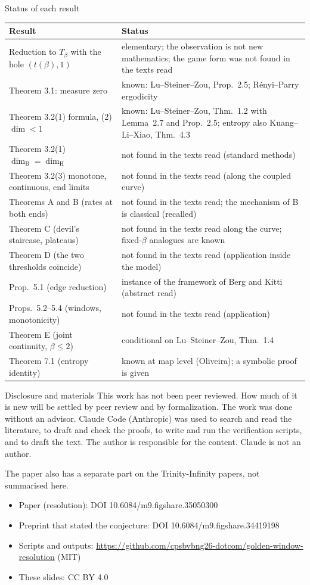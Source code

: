 \documentclass[aspectratio=169,11pt,usepdftitle=false]{beamer}
\newcommand{\dimH}{\dim_{\mathrm H}}
\begin{document}
\begin{frame}{Status of each result}
\scriptsize
\begin{tabular}{>{\raggedright}p{5.3cm}>{\raggedright\arraybackslash}p{7.7cm}}
\toprule
Result & Status\\
\midrule
Reduction to $T_\beta$ with the hole $(t(\beta),1)$ & elementary; the observation is not new mathematics; the game form was not found in the texts read\tabularnewline
Theorem 3.1: measure zero & known: Lu--Steiner--Zou, Prop.~2.5; R\'enyi--Parry ergodicity\tabularnewline
Theorem 3.2(1) formula, (2) $\dim<1$ & known: Lu--Steiner--Zou, Thm.~1.2 with Lemma~2.7 and Prop.~2.5; entropy also Kuang--Li--Xiao, Thm.~4.3\tabularnewline
Theorem 3.2(1) $\dim_{\mathrm B}=\dimH$ & not found in the texts read (standard methods)\tabularnewline
Theorem 3.2(3) monotone, continuous, end limits & not found in the texts read (along the coupled curve)\tabularnewline
Theorems A and B (rates at both ends) & not found in the texts read; the mechanism of B is classical (recalled)\tabularnewline
Theorem C (devil's staircase, plateaus) & not found in the texts read along the curve; fixed-$\beta$ analogues are known\tabularnewline
Theorem D (the two thresholds coincide) & not found in the texts read (application inside the model)\tabularnewline
Prop.~5.1 (edge reduction) & instance of the framework of Berg and Kitti (abstract read)\tabularnewline
Props.~5.2--5.4 (windows, monotonicity) & not found in the texts read (application)\tabularnewline
Theorem E (joint continuity, $\beta\le2$) & conditional on Lu--Steiner--Zou, Thm.~1.4\tabularnewline
Theorem 7.1 (entropy identity) & known at map level (Oliveira); a symbolic proof is given\tabularnewline
\bottomrule
\end{tabular}
\end{frame}

\begin{frame}{Disclosure and materials}
\small
This work has not been peer reviewed. How much of it is new will be settled by peer review and by formalization. The work was done without an advisor. Claude Code (Anthropic) was used to search and read the literature, to draft and check the proofs, to write and run the verification scripts, and to draft the text. The author is responsible for the content. Claude is not an author.

\medskip
The paper also has a separate part on the Trinity-Infinity papers, not summarised here.

\medskip
\begin{itemize}
\item Paper (resolution): DOI 10.6084/m9.figshare.35050300
\item Preprint that stated the conjecture: DOI 10.6084/m9.figshare.34419198
\item Scripts and outputs: \url{https://github.com/cpsbvbng26-dotcom/golden-window-resolution} (MIT)
\item These slides: CC BY 4.0
\end{itemize}
\end{frame}
\end{document}

